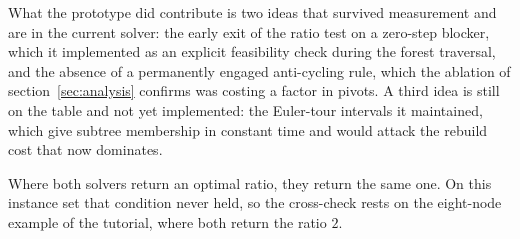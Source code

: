 What the prototype did contribute is two ideas that survived measurement and are
in the current solver: the early exit of the ratio test on a zero-step blocker,
which it implemented as an explicit feasibility check during the forest
traversal, and the absence of a permanently engaged anti-cycling rule, which the
ablation of section~\ref{sec:analysis} confirms was costing a factor in pivots. A
third idea is still on the table and not yet implemented: the Euler-tour
intervals it maintained, which give subtree membership in constant time and would
attack the rebuild cost that now dominates.

Where both solvers return an optimal ratio, they return the same one. On this
instance set that condition never held, so the cross-check rests on the
eight-node example of the tutorial, where both return the ratio $2$.


